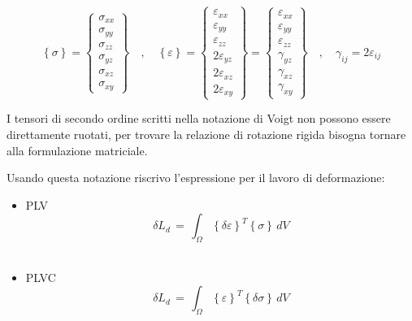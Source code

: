 \begin{equation*}
\left\{\sigma\right\} =
\left\{
\begin{array}{c}
\sigma_{xx} \\[6pt]
\sigma_{yy} \\[6pt]
\sigma_{zz} \\[6pt]
\sigma_{yz} \\[6pt]
\sigma_{xz} \\[6pt]
\sigma_{xy}
\end{array}
\right\}
\quad , \quad
\left\{\varepsilon\right\} =
\left\{
\begin{array}{c}
\varepsilon_{xx} \\[6pt]
\varepsilon_{yy} \\[6pt]
\varepsilon_{zz} \\[6pt]
2 \varepsilon_{yz} \\[6pt]
2 \varepsilon_{xz} \\[6pt]
2 \varepsilon_{xy}
\end{array}
\right\}
=
\left\{
\begin{array}{c}
\varepsilon_{xx} \\[6pt]
\varepsilon_{yy} \\[6pt]
\varepsilon_{zz} \\[6pt]
\gamma_{yz} \\[6pt]
\gamma_{xz} \\[6pt]
\gamma_{xy}
\end{array}
\right\}
\quad , \quad
\gamma_{ij} = 2 \varepsilon_{ij}
\end{equation*}

I tensori di secondo ordine scritti nella notazione di Voigt non possono essere direttamente ruotati, per trovare la relazione di rotazione rigida bisogna tornare alla formulazione matriciale.


Usando questa notazione riscrivo l'espressione per il lavoro di deformazione:

\begin{itemize}
    \item PLV 
    \begin{equation*}
      \delta L_d \, = \,  \int_{\Omega}  \left\{\delta\varepsilon\right\}^T  \left\{\sigma\right\}  \, dV
    \end{equation*}\\
    \item PLVC
    \begin{equation*}
       \delta L_d \, = \,  \int_{\Omega}  \left\{\varepsilon\right\}^T  \left\{\delta\sigma\right\}  \, dV
    \end{equation*}
\end{itemize}

